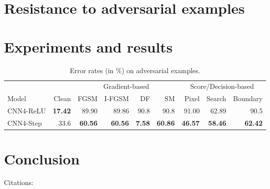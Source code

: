 \documentclass[a4paper]{article}
\begin{document}
\section{Resistance to adversarial examples}
\label{S:6}




\section{Experiments and results}
\label{S:7}

\renewcommand{\arraystretch}{1.2}
\begin{table}[H]
\centering
\caption{Error rates (in \%) on adversarial examples.}
\begin{tabular}{@{}lrrrrrrrr@{}}
 & & \multicolumn{4}{c}{Gradient-based} & \multicolumn{3}{c}{Score/Decision-based}  \\ 
\cmidrule{3-6} \cmidrule{7-9}
Model & Clean & FGSM & I-FGSM & DF & SM & Pixel & Search & Boundary  \\ \hline
CNN4-ReLU & \textbf{17.42} & 89.90 & 89.86 & 90.8 & 90.8 & 91.00 & 62.89 & 90.5  \\ \hline
CNN4-Step & 33.6 & \textbf{60.56} & \textbf{60.56} & \textbf{7.58} & \textbf{60.86} & \textbf{46.57} & \textbf{58.46} & \textbf{62.42}  \\
\bottomrule
\end{tabular}
\end{table}




\section{Conclusion}
\label{S:8}


Citations:
\cite{hubara2016quantized}
\cite{friesen2017deep}
\cite{lee2015difference}
\cite{bengio2014auto}
\cite{bengio2013estimating}
\cite{hinton2012neural}


\end{document}
